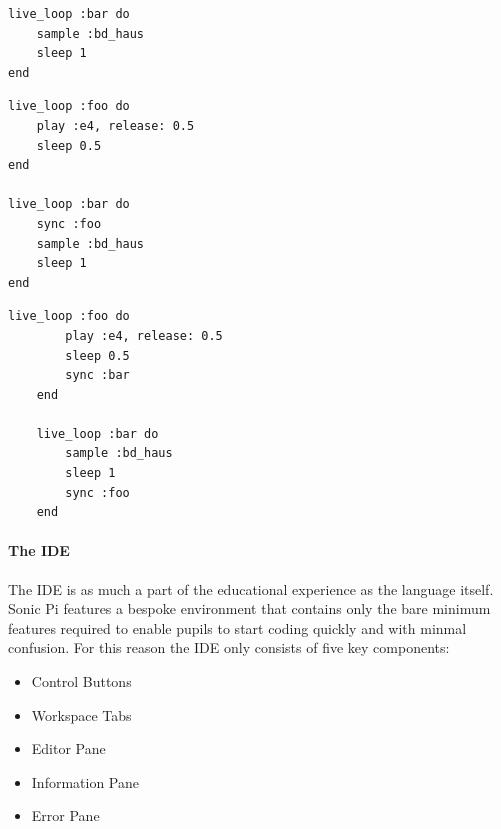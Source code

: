 \documentclass[11pt, abstracton, twoside]{scrartcl}
\begin{document}
\begin{multicols}{2}
\begin{minipage}{0.5\textwidth}
\begin{minipage}{\textwidth}
\begin{lstlisting}[style = sonicpi]
live_loop :bar do
    sample :bd_haus
    sleep 1
end
			\end{lstlisting}
			 \label{outofsync}
		\end{minipage}
		\begin{minipage}{\textwidth}
			\begin{lstlisting}[style = sonicpi]
live_loop :foo do
    play :e4, release: 0.5
    sleep 0.5
end

live_loop :bar do
    sync :foo
    sample :bd_haus
    sleep 1
end
			\end{lstlisting}
			 \label{synced}
		\end{minipage}

	\end{minipage}
\end{multicols}

\begin{minipage}{\textwidth}
	\begin{lstlisting}[style = sonicpi]
	live_loop :foo do
	    play :e4, release: 0.5
	    sleep 0.5
	    sync :bar
	end

	live_loop :bar do
	    sample :bd_haus
	    sleep 1
	    sync :foo
	end
	\end{lstlisting}
\end{minipage}

\paragraph{The IDE}
The IDE is as much a part of the educational experience as the language 
itself. Sonic Pi features a bespoke environment that contains only the bare 
minimum features required to enable pupils to start coding quickly and with 
minmal confusion. For this reason the IDE only consists of five key components:

\begin{itemize}
	\item Control Buttons
	\item Workspace Tabs
	\item Editor Pane
	\item Information Pane
	\item Error Pane
\end{itemize}
\end{document}
